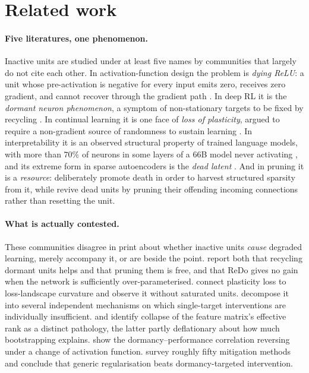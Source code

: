 \documentclass[10pt]{article}
\begin{document}
\section{Related work}
\label{sec:related}

\paragraph{Five literatures, one phenomenon.}
Inactive units are studied under at least five names by communities that
largely do not cite each other. In activation-function design the problem is
\emph{dying ReLU}: a unit whose pre-activation is negative for every input emits
zero, receives zero gradient, and cannot recover through the gradient path
\citep{glorot2011deep, maas2013rectifier, lu2020dying}. In deep RL it is the
\emph{dormant neuron phenomenon}, a symptom of non-stationary targets to be
fixed by recycling \citep{sokar2023dormant}. In continual learning it is one
face of \emph{loss of plasticity}, argued to require a non-gradient source of
randomness to sustain learning \citep{dohare2021continual, dohare2024loss}. In
interpretability it is an observed structural property of trained language
models, with more than $70\%$ of neurons in some layers of a 66B model never
activating \citep{voita2024neurons}, and its extreme form in sparse autoencoders
is the \emph{dead latent} \citep{gao2024scaling}. And in pruning it is a
\emph{resource}: \citet{dufortlabbe2024maxwell} deliberately promote death in
order to harvest structured sparsity from it, while \citet{whitaker2023synaptic}
revive dead units by pruning their offending incoming connections rather than
resetting the unit.

\paragraph{What is actually contested.}
These communities disagree in print about whether inactive units \emph{cause}
degraded learning, merely accompany it, or are beside the point.
\citet{sokar2023dormant} report both that recycling dormant units helps and
that pruning them is free, and that ReDo gives no gain when the network is
sufficiently over-parameterised. \citet{lyle2023understanding} connect plasticity
loss to loss-landscape curvature and observe it without saturated units.
\citet{lyle2024disentangling} decompose it into several independent mechanisms
on which single-target interventions are individually insufficient.
\citet{kumar2021implicit} and \citet{gulcehre2022empirical} identify collapse of
the feature matrix's effective rank as a distinct pathology, the latter partly
deflationary about how much bootstrapping explains. \citet{kooi2024hadamard}
show the dormancy--performance correlation reversing under a change of
activation function. \citet{klein2024plasticity} survey roughly fifty mitigation
methods and conclude that generic regularisation beats dormancy-targeted
intervention.
\end{document}
